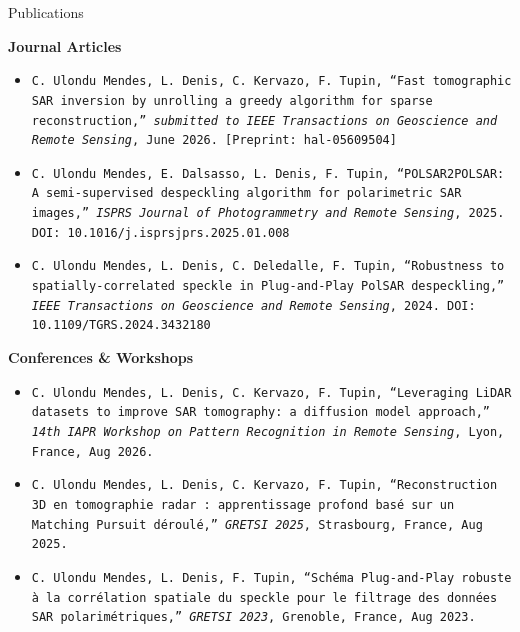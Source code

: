 \documentclass{resume} %
\begin{document}

\begin{rSection}{Publications}

\textbf{Journal Articles}
\begin{itemize}
\item \texttt{C. Ulondu Mendes, L. Denis, C. Kervazo, F. Tupin, ``Fast tomographic SAR inversion by unrolling a greedy algorithm for sparse reconstruction,'' \textit{submitted to IEEE Transactions on Geoscience and Remote Sensing}, June 2026. [Preprint: hal-05609504]}

\item \texttt{C. Ulondu Mendes, E. Dalsasso, L. Denis, F. Tupin, ``POLSAR2POLSAR: A semi-supervised despeckling algorithm for polarimetric SAR images,'' \textit{ISPRS Journal of Photogrammetry and Remote Sensing}, 2025. DOI: 10.1016/j.isprsjprs.2025.01.008}

\item \texttt{C. Ulondu Mendes, L. Denis, C. Deledalle, F. Tupin, ``Robustness to spatially-correlated speckle in Plug-and-Play PolSAR despeckling,'' \textit{IEEE Transactions on Geoscience and Remote Sensing}, 2024. DOI: 10.1109/TGRS.2024.3432180}
\end{itemize}

\textbf{Conferences \& Workshops}
\begin{itemize}
\item \texttt{C. Ulondu Mendes, L. Denis, C. Kervazo, F. Tupin, ``Leveraging LiDAR datasets to improve SAR tomography: a diffusion model approach,'' \textit{14th IAPR Workshop on Pattern Recognition in Remote Sensing}, Lyon, France, Aug 2026.}

\item \texttt{C. Ulondu Mendes, L. Denis, C. Kervazo, F. Tupin, ``Reconstruction 3D en tomographie radar : apprentissage profond basé sur un Matching Pursuit déroulé,'' \textit{GRETSI 2025}, Strasbourg, France, Aug 2025.}

\item \texttt{C. Ulondu Mendes, L. Denis, F. Tupin, ``Schéma Plug-and-Play robuste à la corrélation spatiale du speckle pour le filtrage des données SAR polarimétriques,'' \textit{GRETSI 2023}, Grenoble, France, Aug 2023.}
\end{itemize}

\end{rSection}
\end{document}
